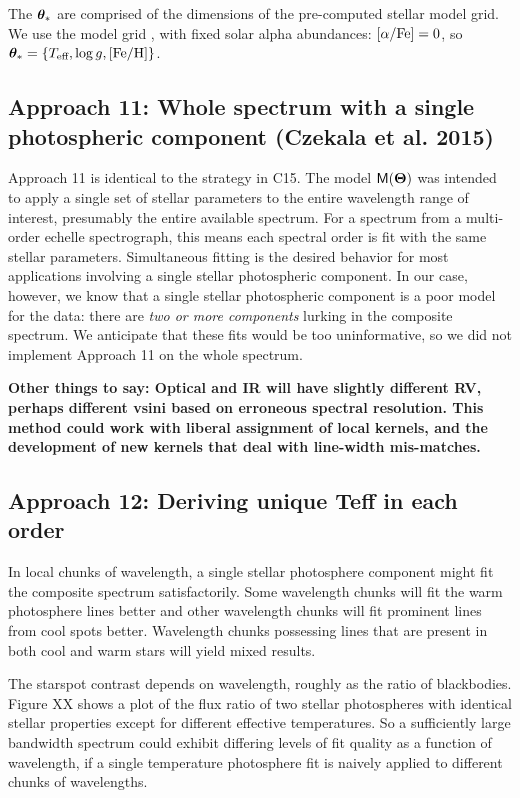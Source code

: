 \documentclass[twocolumn]{emulateapj}%
\newcommand{\iancze}{{\sc C15}}
\begin{document}
The ${\bm \theta}_{\ast}$ are comprised of the dimensions of the pre-computed stellar model grid.  We use the \PHOENIX model grid \citep{husser13}, with fixed solar alpha abundances: $[\alpha/{\rm Fe}] = 0$, so ${\bm \theta}_{\ast} = \{T_\textrm{eff}, \log g, [{\rm Fe}/{\rm H}] \}$.




\subsection{Approach 11: Whole spectrum with a single photospheric component (Czekala et al. 2015)}

Approach 11 is identical to the strategy in \iancze.  The model $\mathsf{M}({\bm \Theta})$ was intended to apply a single set of stellar parameters to the entire wavelength range of interest, presumably the entire available spectrum.  For a spectrum from a multi-order echelle spectrograph, this means each spectral order is fit with the same stellar parameters.  Simultaneous fitting is the desired behavior for most applications involving a single stellar photospheric component.  In our case, however, we know that a single stellar photospheric component is a poor model for the data: there are \emph{two or more components} lurking in the composite spectrum.  We anticipate that these fits would be too uninformative, so we did not implement Approach 11 on the whole spectrum.

\textbf{Other things to say: Optical and IR will have slightly different RV, perhaps different vsini based on erroneous spectral resolution.  This method could work with liberal assignment of local kernels, and the development of new kernels that deal with line-width mis-matches.}

\subsection{Approach 12: Deriving unique Teff in each order}
\label{sec:approach12}

In local chunks of wavelength, a single stellar photosphere component might fit the composite spectrum satisfactorily.  Some wavelength chunks will fit the warm photosphere lines better and other wavelength chunks will fit prominent lines from cool spots better.  Wavelength chunks possessing lines that are present in both cool and warm stars will yield mixed results.

The starspot contrast depends on wavelength, roughly as the ratio of blackbodies.  Figure XX shows a plot of the flux ratio of two stellar photospheres with identical stellar properties except for different effective temperatures.  So a sufficiently large bandwidth spectrum could exhibit differing levels of fit quality as a function of wavelength, if a single temperature photosphere fit is naively applied to different chunks of wavelengths.  
\end{document}
